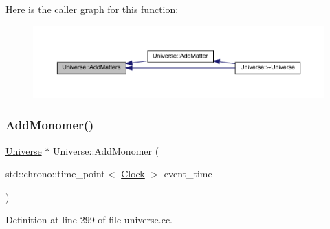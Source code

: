 Here is the caller graph for this function\+:
\nopagebreak
\begin{figure}[H]
\begin{center}
\leavevmode
\includegraphics[width=350pt]{class_universe_ae00d10b2a23c9cedf1ff89e9da875563_icgraph}
\end{center}
\end{figure}
\mbox{\label{class_universe_a062a9472f0400e566ecc7dc056d989d9}} 
\subsubsection{\texorpdfstring{Add\+Monomer()}{AddMonomer()}}
{\footnotesize\ttfamily \hyperlink{class_universe}{Universe} $\ast$ Universe\+::\+Add\+Monomer (\begin{DoxyParamCaption}\item[{std\+::chrono\+::time\+\_\+point$<$ \hyperlink{universe_8h_a0ef8d951d1ca5ab3cfaf7ab4c7a6fd80}{Clock} $>$}]{event\+\_\+time }\end{DoxyParamCaption})}



Definition at line 299 of file universe.\+cc.

